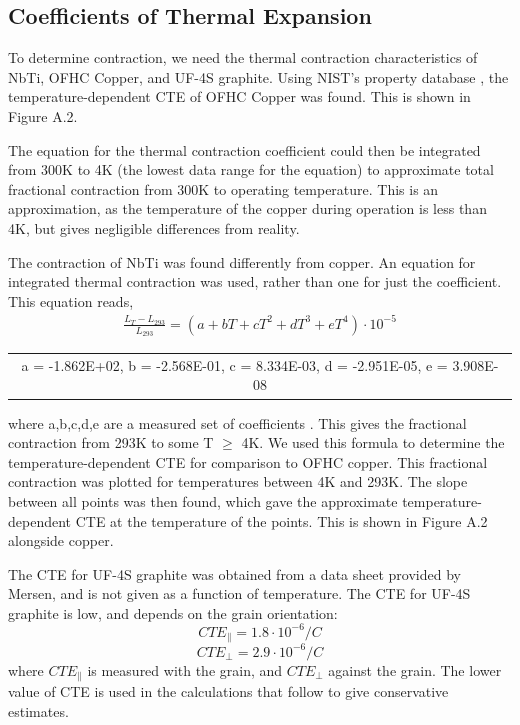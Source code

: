 \documentclass{report}
\begin{document}
\begin{appendices}
\section{Coefficients of Thermal Expansion}

To determine contraction, we need the thermal contraction characteristics of NbTi, OFHC Copper, and UF-4S graphite. Using NIST's property database \cite{ofhc_copper}, the temperature-dependent CTE of OFHC Copper was found. This is shown in Figure A.2.

The equation for the thermal contraction coefficient could then be integrated from 300K to 4K (the lowest data range for the equation) to approximate total fractional contraction from 300K to operating temperature. This is an approximation, as the temperature of the copper during operation is less than 4K, but gives negligible differences from reality.

The contraction of NbTi was found differently from copper. An equation for integrated thermal contraction was used, rather than one for just the coefficient. This equation reads,
\begin{eqnarray}
\frac{L_{T} - L_{293}}{L_{293}} = (a + bT + cT^2 + dT^3 + eT^4) \cdot 10^{-5}
\end{eqnarray}
\begin{table}[h]
\begin{tabular}{c}
a = -1.862E+02, b = -2.568E-01, c = 8.334E-03,  d = -2.951E-05, e = 3.908E-08\\
\end{tabular}
\end{table}

where a,b,c,d,e are a measured set of coefficients \cite{Marquardt2000}. This gives the fractional contraction from 293K to some T $\geq$ 4K. We used this formula to determine the temperature-dependent CTE for comparison to OFHC copper. This fractional contraction was plotted for temperatures between 4K and 293K. The slope between all points was then found, which gave the approximate temperature-dependent CTE at the temperature of the points. This is shown in Figure A.2 alongside copper.

The CTE for UF-4S graphite was obtained from a data sheet provided by Mersen, and is not given as a function of temperature. The CTE for UF-4S graphite is low, and depends on the grain orientation:
$$
CTE_{\parallel} = 1.8 \cdot 10^{-6}/C
$$
$$
CTE_{\perp} = 2.9 \cdot 10^{-6}/C
$$
where $CTE_{\parallel}$ is measured with the grain, and $CTE_{\perp}$ against the grain. The lower value of CTE is used in the calculations that follow to give conservative estimates.


\end{appendices}
\end{document}
